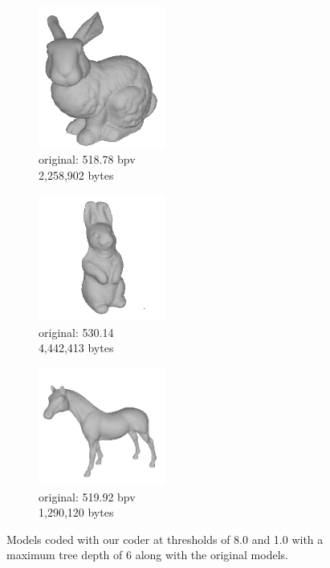 \begin{figure}[t]
        \begin{subfigure}[b]{4.4cm}
                \includegraphics[width=4.2cm]{images/results/compression/bunnyorig}
                \caption{original: 518.78 bpv\\2,258,902 bytes}
                \label{fig:FIG_BUNNYO}
        \end{subfigure}%
        \begin{subfigure}[b]{4.4cm}
                \includegraphics[width=4.2cm]{images/results/compression/rabbitorig}
                \caption{original: 530.14\\4,442,413 bytes}
                \label{fig:FIG_RABBITO}
        \end{subfigure}%
        \begin{subfigure}[b]{4.4cm}
                \includegraphics[width=4.2cm]{images/results/compression/horseorig}
                \caption{original: 519.92 bpv\\1,290,120 bytes}
                \label{fig:FIG_HORSEO}
        \end{subfigure}
       
       \caption{Models coded with our coder at thresholds of 8.0 and 1.0 with a maximum tree depth of 6 along with the original models.}
       \label{fig:FIGS}
\end{figure}


